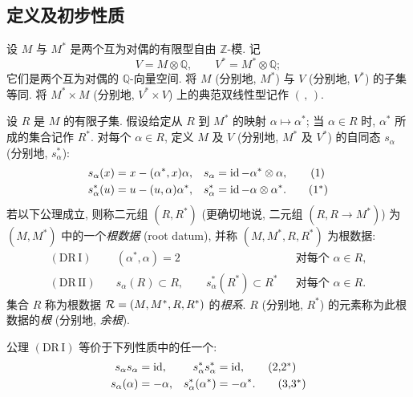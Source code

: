 \subsection{定义及初步性质}
\begin{definition}\label{sga3:XXI:1.1.1}
设 \(M\) 与 \(M^\ast\) 是两个互为对偶的有限型自由 \(\mathbb Z\)-模. 记
\[
  V=M\otimes\mathbb Q,\qquad V^\ast=M^\ast\otimes\mathbb Q;
\]
它们是两个互为对偶的 \(\mathbb Q\)-向量空间. 将 \(M\) (分别地, \(M^\ast\)) 与 \(V\) (分别地, \(V^\ast\)) 的子集等同. 将 \(M^\ast\times M\) (分别地, \(V^\ast\times V\)) 上的典范双线性型记作 \((\, ,\,)\).

设 \(R\) 是 \(M\) 的有限子集. 假设给定从 \(R\) 到 \(M^\ast\) 的映射 \(\alpha\mapsto\alpha^\ast\); 当 \(\alpha\in R\) 时, \(\alpha^\ast\) 所成的集合记作 \(R^\ast\). 对每个 \(\alpha\in R\), 定义 \(M\) 及 \(V\) (分别地, \(M^\ast\) 及 \(V^\ast\)) 的自同态 \(s_\alpha\) (分别地, \(s_\alpha^\ast\)):
\begin{align}
 s_\alpha(x)&=x-(\alpha^\ast,x)\alpha,
 &s_\alpha&=\operatorname{id}-\alpha^\ast\otimes\alpha,
 \tag{1}\label{sga3:XXI:eq:1}\\
 s_\alpha^\ast(u)&=u-(u,\alpha)\alpha^\ast,
 &s_\alpha^\ast&=\operatorname{id}-\alpha\otimes\alpha^\ast.
 \tag{1${}^\ast$}\label{sga3:XXI:eq:1star}
\end{align}
若以下公理成立, 则称二元组 \((R,R^\ast)\) (更确切地说, 二元组 \((R,R\to M^\ast)\)) 为 \((M,M^\ast)\) 中的一个\emph{根数据} (root datum), 并称 \((M,M^\ast,R,R^\ast)\) 为根数据:
\begin{align*}
 (\mathrm{DR\,I})\quad&
    (\alpha^\ast,\alpha)=2
    &&\text{对每个 }\alpha\in R,\\
 (\mathrm{DR\,II})\quad&
    s_\alpha(R)\subset R,\qquad
    s_\alpha^\ast(R^\ast)\subset R^\ast
    &&\text{对每个 }\alpha\in R.
\end{align*}
集合 \(R\) 称为根数据 \(\mathcal{R}=(M,M^\ast,R,R^\ast)\) 的\emph{根系}. \(R\) (分别地, \(R^\ast\)) 的元素称为此根数据的\emph{根} (分别地, \emph{余根}).
\end{definition}

\begin{remark}\label{sga3:XXI:1.1.2}
公理 \((\mathrm{DR\,I})\) 等价于下列性质中的任一个:
\begin{align}
 s_\alpha s_\alpha&=\operatorname{id},
 &s_\alpha^\ast s_\alpha^\ast&=\operatorname{id},
 \tag{2,2${}^\ast$}\label{sga3:XXI:eq:2}\\
 s_\alpha(\alpha)&=-\alpha,
 &s_\alpha^\ast(\alpha^\ast)&=-\alpha^\ast.
 \tag{3,3${}^\ast$}\label{sga3:XXI:eq:3}
\end{align}
\end{remark}

